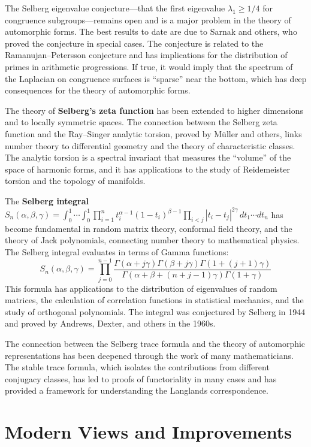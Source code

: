 The Selberg eigenvalue conjecture---that the first eigenvalue $\lambda_1 \geq 1/4$ for congruence subgroups---remains open and is a major problem in the theory of automorphic forms. The best results to date are due to Sarnak and others, who proved the conjecture in special cases. The conjecture is related to the Ramanujan--Petersson conjecture and has implications for the distribution of primes in arithmetic progressions. If true, it would imply that the spectrum of the Laplacian on congruence surfaces is ``sparse'' near the bottom, which has deep consequences for the theory of automorphic forms.

The theory of \textbf{Selberg's zeta function} has been extended to higher dimensions and to locally symmetric spaces. The connection between the Selberg zeta function and the Ray--Singer analytic torsion, proved by M\"{u}ller and others, links number theory to differential geometry and the theory of characteristic classes. The analytic torsion is a spectral invariant that measures the ``volume'' of the space of harmonic forms, and it has applications to the study of Reidemeister torsion and the topology of manifolds.

The \textbf{Selberg integral} $S_n(\alpha, \beta, \gamma) = \int_0^1 \cdots \int_0^1 \prod_{i=1}^n t_i^{\alpha-1} (1-t_i)^{\beta-1} \prod_{i<j} |t_i - t_j|^{2\gamma} \, dt_1 \cdots dt_n$ has become fundamental in random matrix theory, conformal field theory, and the theory of Jack polynomials, connecting number theory to mathematical physics. The Selberg integral evaluates in terms of Gamma functions:
\[S_n(\alpha, \beta, \gamma) = \prod_{j=0}^{n-1} \frac{\Gamma(\alpha + j\gamma) \Gamma(\beta + j\gamma) \Gamma(1 + (j+1)\gamma)}{\Gamma(\alpha + \beta + (n+j-1)\gamma) \Gamma(1 + \gamma)}\]
This formula has applications to the distribution of eigenvalues of random matrices, the calculation of correlation functions in statistical mechanics, and the study of orthogonal polynomials. The integral was conjectured by Selberg in 1944 and proved by Andrews, Dexter, and others in the 1960s.

The connection between the Selberg trace formula and the theory of automorphic representations has been deepened through the work of many mathematicians. The stable trace formula, which isolates the contributions from different conjugacy classes, has led to proofs of functoriality in many cases and has provided a framework for understanding the Langlands correspondence.

\section{Modern Views and Improvements}

